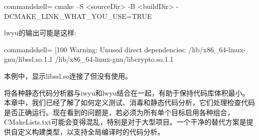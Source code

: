 \begin{tcblisting}{commandshell={}}
cmake –S <sourceDir> -B <buildDir> -DCMAKE_LINK_WHAT_YOU_USE=TRUE
\end{tcblisting}

lwyu的输出可能是这样:

\begin{tcblisting}{commandshell={}}
[100%
Warning: Unused direct dependencies:
        /lib/x86_64-linux-gnu/libssl.so.1.1
        /lib/x86_64-linux-gnu/libcrypto.so.1.1
\end{tcblisting}

本例中，显示libssl.so连接了但没有使用。

将各种静态代码分析器与iwyu和lwyu结合在一起，有助于保持代码库体积最小。本章中，我们已经了解了如何定义测试、消毒和静态代码分析，它们处理检查代码是否正确运行。现在看到的问题是，若必须为所有单个目标启用各种组合，CMakeLists.txt可能会变得混乱，特别是对于大型项目。一个干净的替代方案是提供自定义构建类型，以支持全局编译时的代码分析。














